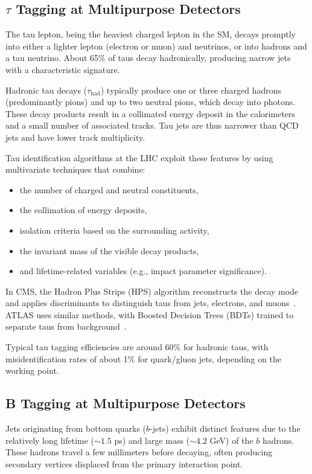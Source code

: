\subsection{$\tau$ Tagging at Multipurpose Detectors}

The tau lepton, being the heaviest charged lepton in the SM, decays promptly into either a lighter lepton (electron or muon) and neutrinos, or into hadrons and a tau neutrino. About 65\% of taus decay hadronically, producing narrow jets with a characteristic signature.

Hadronic tau decays ($\tau_{\text{had}}$) typically produce one or three charged hadrons (predominantly pions) and up to two neutral pions, which decay into photons. These decay products result in a collimated energy deposit in the calorimeters and a small number of associated tracks. Tau jets are thus narrower than QCD jets and have lower track multiplicity.

Tau identification algorithms at the LHC exploit these features by using multivariate techniques that combine:
\begin{itemize}
    \item the number of charged and neutral constituents,
    \item the collimation of energy deposits,
    \item isolation criteria based on the surrounding activity,
    \item the invariant mass of the visible decay products,
    \item and lifetime-related variables (e.g., impact parameter significance).
\end{itemize}

In CMS, the Hadron Plus Strips (HPS) algorithm reconstructs the decay mode and applies discriminants to distinguish taus from jets, electrons, and muons~\parencite{CMS:2022ydz}. ATLAS uses similar methods, with Boosted Decision Trees (BDTs) trained to separate taus from background~\parencite{ATLAS:2022fgo}.

Typical tau tagging efficiencies are around 60\% for hadronic taus, with misidentification rates of about 1\% for quark/gluon jets, depending on the working point.

\subsection{B Tagging at Multipurpose Detectors}

Jets originating from bottom quarks ($b$-jets) exhibit distinct features due to the relatively long lifetime ($\sim 1.5$ ps) and large mass ($\sim 4.2$ GeV) of the $b$ hadrons. These hadrons travel a few millimeters before decaying, often producing secondary vertices displaced from the primary interaction point.

